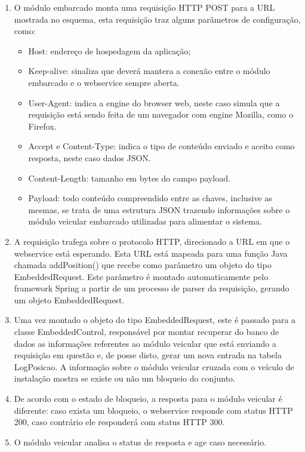 \begin{enumerate}
	\item O módulo embarcado monta uma requisição HTTP POST para a URL mostrada no esquema, esta requisição traz alguns parâmetros de configuração, como:
	\begin{itemize}
		\item Host: endereço de hospedagem da aplicação;
		\item Keep-alive: sinaliza que deverá mantera a conexão entre o módulo embarcado e o webservice sempre aberta.
		\item User-Agent: indica a engine do browser web, neste caso simula que a requisição está sendo feita de um navegador com engine Mozilla, como o Firefox.
		\item Accept e Content-Type: indica o tipo de conteúdo enviado e aceito como resposta, neste caso dados JSON.
		\item Content-Length: tamanho em bytes do campo payload.
		\item Payload: todo conteúdo compreendido entre as chaves, inclusive as mesmas, se trata de uma estrutura JSON trazendo informações sobre o módulo veicular embarcado utilizadas para alimentar o sistema. 
	\end{itemize}
	
	\item A requisição trafega sobre o protocolo HTTP, direcionado a URL em que o webservice está esperando. Esta URL está mapeada para uma função Java chamada addPosition() que recebe como parâmetro um objeto do tipo EmbeddedRequest. Este parâmetro é montado automaticamente pelo framework Spring a partir de um processo de parser da requisição, gerando um objeto EmbeddedRequest.
	\item Uma vez montado o objeto do tipo EmbeddedRequest, este é passado para a classe EmbeddedControl, responsável por montar recuperar do banco de dados as informações referentes ao módulo veicular que está enviando a requisição em questão e, de posse disto, gerar um nova entrada na tabela LogPosicao. A informação sobre o módulo veicular cruzada com o veículo de instalação mostra se existe ou não um bloqueio do conjunto.
	\item De acordo com o estado de bloqueio, a resposta para o módulo veicular é diferente: caso exista um bloqueio, o webservice responde com status HTTP 200, caso contrário ele responderá com status HTTP 300.
	\item O módulo veicular analisa o status de resposta e age caso necessário.
\end{enumerate}


